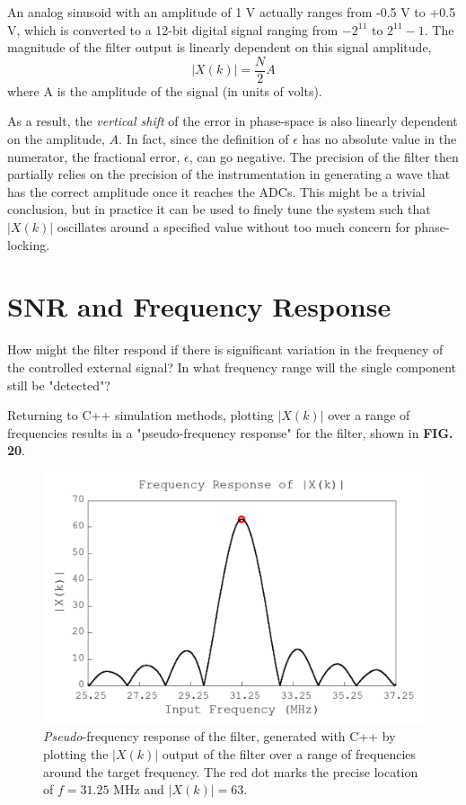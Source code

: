 \documentclass[reprint,amsmath,amssymb]{revtex4-2}
\begin{document}
An analog sinusoid with an amplitude of 1 V actually ranges from -0.5 V to +0.5 V, which is converted to a 12-bit digital signal ranging from $-2^{11}$ to $2^{11} - 1$. The magnitude of the filter output is linearly dependent on this signal amplitude,
\begin{equation}
    |X(k)| = \frac{N}{2}A
\end{equation}
where A is the amplitude of the signal (in units of volts). 

As a result, the \textit{vertical shift} of the error in phase-space is also linearly dependent on the amplitude, $A$. In fact, since the definition of $\epsilon$ has no absolute value in the numerator, the fractional error, $\epsilon$, can go negative. The precision of the filter then partially relies on the precision of the instrumentation in generating a wave that has the correct amplitude once it reaches the ADCs. This might be a trivial conclusion, but in practice it can be used to finely tune the system such that $|X(k)|$ oscillates around a specified value without too much concern for phase-locking.

\section{SNR and Frequency Response}

How might the filter respond if there is significant variation in the frequency of the controlled external signal? In what frequency range will the single component still be "detected"?

Returning to C++ simulation methods, plotting $|X(k)|$ over a range of frequencies results in a "pseudo-frequency response" for the filter, shown in \textbf{FIG. 20}. 

\begin{figure}[H]
    \centering
    \includegraphics[width=\linewidth]{figs/frequency_response.png}
    \caption{\textit{Pseudo}-frequency response of the filter, generated with C++ by plotting the $|X(k)|$ output of the filter over a range of frequencies around the target frequency. The red dot marks the precise location of $f = 31.25$ MHz and $|X(k)| = 63$.}
    \label{fig:20}
\end{figure}
\end{document}

